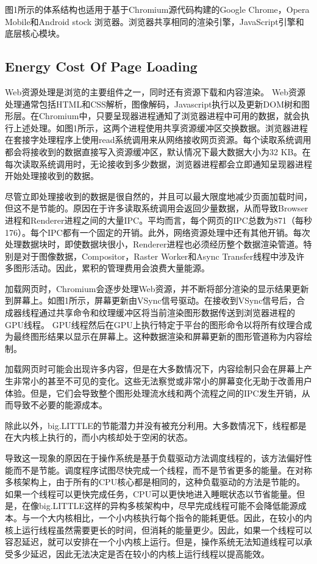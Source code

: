 \documentclass{sig-alternate-05-2015}
\begin{document}
图1所示的体系结构也适用于基于Chromium源代码构建的Google Chrome，Opera Mobile和Android stock 浏览器\cite{6}\cite{8}。浏览器共享相同的渲染引擎，JavaScript引擎和底层核心模块。

\subsection{Energy Cost Of Page Loading}

Web资源处理是浏览的主要组件之一，同时还有资源下载和内容渲染。 Web资源处理通常包括HTML和CSS解析，图像解码，Javascript执行以及更新DOM树和图形层。在Chromium中，只要呈现器进程通知了浏览器进程中可用的数据，就会执行上述处理。如图1所示，这两个进程使用共享资源缓冲区交换数据。浏览器进程在套接字处理程序上使用read系统调用来从网络接收网页资源。每个读取系统调用都会将接收到的数据直接写入资源缓冲区，默认情况下最大数据大小为32 KB。在每次读取系统调用时，无论接收到多少数据，浏览器进程都会立即通知呈现器进程开始处理接收到的数据。

尽管立即处理接收到的数据是很自然的，并且可以最大限度地减少页面加载时间，但这不是节能的。原因在于许多读取系统调用会返回少量数据，从而导致Browser进程和Renderer进程之间的大量IPC。平均而言，每个网页的IPC总数为871（每秒176）。每个IPC都有一个固定的开销。此外，网络资源处理中还有其他开销。每次处理数据块时，即使数据块很小，Renderer进程也必须经历整个数据渲染管道。特别是对于图像数据，Compositor，Raster Worker和Async Transfer线程中涉及许多图形活动。因此，累积的管理费用会浪费大量能源。

加载网页时，Chromium会逐步处理Web资源，并不断将部分渲染的显示结果更新到屏幕上。如图1所示，屏幕更新由VSync信号驱动。在接收到VSync信号后，合成器线程通过共享命令和纹理缓冲区将当前渲染图形数据传送到浏览器进程的GPU线程。 GPU线程然后在GPU上执行特定于平台的图形命令以将所有纹理合成为最终图形结果以显示在屏幕上。这种数据渲染和屏幕更新的图形管道称为内容绘制。

加载网页时可能会出现许多内容，但是在大多数情况下，内容绘制只会在屏幕上产生非常小的甚至不可见的变化。这些无法察觉或非常小的屏幕变化无助于改善用户体验。但是，它们会导致整个图形处理流水线和两个流程之间的IPC发生开销，从而导致不必要的能源成本。

除此以外，big.LITTLE的节能潜力并没有被充分利用。大多数情况下，线程都是在大内核上执行的，而小内核却处于空闲的状态。

导致这一现象的原因在于操作系统是基于负载驱动方法调度线程的，该方法偏好性能而不是节能。调度程序试图尽快完成一个线程，而不是节省更多的能量。在对称多核架构上，由于所有的CPU核心都是相同的，这种负载驱动的方法是节能的。如果一个线程可以更快完成任务，CPU可以更快地进入睡眠状态以节省能量。\cite{7}但是，在像big.LITTLE这样的异构多核架构中，尽早完成线程可能不会降低能源成本。与一个大内核相比，一个小内核执行每个指令的能耗更低。因此，在较小的内核上运行线程虽然需要更长的时间，但消耗的能量更少。因此，如果一个线程可以容忍延迟，就可以安排在一个小内核上运行。但是，操作系统无法知道线程可以承受多少延迟，因此无法决定是否在较小的内核上运行线程以提高能效。
\end{document}
